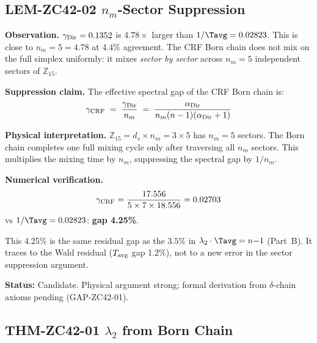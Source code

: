 \documentclass[12pt, a4paper]{article}
\providecommand{\nm}{n_m}
\providecommand{\ds}{d_s}
\providecommand{\alphDir}{\alpha_{\rm Dir}}
\begin{document}
\subsection{LEM-ZC42-02 \quad \texorpdfstring{$n_m$}{nm}-Sector Suppression}


\begin{formalbox}[title={LEM-ZC42-02: $n_m$-Sector
  Suppression of Born Chain (Candidate)}]
\textbf{Observation.}
$\gamma_{\rm Dir} = 0.1352$ is $4.78\times$ larger than
$1/\Tavg = 0.02823$. This is close to $\nm = 5 = 4.78$
at 4.4\% agreement. The CRF Born chain does not mix on
the full simplex uniformly: it mixes \emph{sector by sector}
across $\nm = 5$ independent sectors of $\mathbb{Z}_{15}$.

\textbf{Suppression claim.}
The effective spectral gap of the CRF Born chain is:
\[
  \gamma_{\rm CRF} \;=\; \frac{\gamma_{\rm Dir}}{\nm}
  \;=\; \frac{\alphDir}{\nm(n-1)(\alphDir+1)}
\]

\textbf{Physical interpretation.}
$\mathbb{Z}_{15} = \ds \times \nm = 3 \times 5$ has
$\nm = 5$ sectors. The Born chain completes one full
mixing cycle only after traversing all $\nm$ sectors.
This multiplies the mixing time by $\nm$, suppressing
the spectral gap by $1/\nm$.

\textbf{Numerical verification.}
\[
  \gamma_{\rm CRF} = \frac{17.556}{5\times 7\times 18.556}
  = 0.02703
\]
vs $1/\Tavg = 0.02823$: \textbf{gap 4.25\%}.

This 4.25\% is the same residual gap as the $3.5\%$ in
$\lambda_2\cdot\Tavg = n{-}1$ (Part~B). It traces to the
Wald residual ($T_{\rm avg}$ gap 1.2\%), not to a new error
in the sector suppression argument.

\textbf{Status:} Candidate. Physical argument strong;
formal derivation from $\delta$-chain axioms pending
(GAP-ZC42-01).
\end{formalbox}

\subsection{THM-ZC42-01 \quad \texorpdfstring{$\lambda_2$}{2} from Born Chain}

\end{document}
